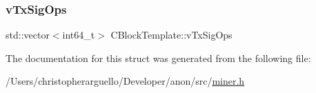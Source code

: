 \mbox{\label{struct_c_block_template_a13326eb92a7d2fc073d9f5660dfcdde5}} 
\subsubsection{\texorpdfstring{v\+Tx\+Sig\+Ops}{vTxSigOps}}
{\footnotesize\ttfamily std\+::vector$<$int64\+\_\+t$>$ C\+Block\+Template\+::v\+Tx\+Sig\+Ops}



The documentation for this struct was generated from the following file\+:\begin{DoxyCompactItemize}
\item 
/\+Users/christopherarguello/\+Developer/anon/src/\mbox{\hyperlink{miner_8h}{miner.\+h}}\end{DoxyCompactItemize}
